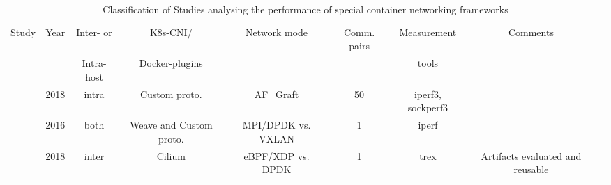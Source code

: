 \documentclass[conference]{IEEEtran}
\begin{document}
\begin{table}[!h]

 \begin{center}

   \caption{ Classification of Studies analysing the performance of special container networking frameworks}\label{tab:2}

   \begin{tabular}{c c c c c c c c c}
     \hline
     Study & Year & Inter- or & K8s-CNI/& Network mode & Comm. pairs & Measurement& Comments  \\ 
      &  & Intra-host & Docker-plugins & & & tools &   \\ 
     \hline
     \cite{Nakamura:2018} & 2018 & intra & Custom proto. & AF\_Graft & 50 & iperf3, sockperf3 & \\     
     \cite{HotNets:16:FreeFlow} & 2016 & both & Weave and Custom proto. & MPI/DPDK vs. VXLAN &1 & iperf & & \\
     \cite{CoNEXT:2018} & 2018 & inter & Cilium & eBPF/XDP vs. DPDK & 1 & trex & Artifacts evaluated and reusable & \\
     \hline 

   \end{tabular}

 \end{center}
\end{table} 
\end{document}
